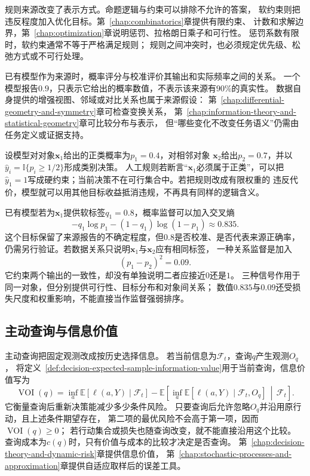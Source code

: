 规则来源改变了表示方式。命题逻辑与约束可以排除不允许的答案，
软约束则把违反程度加入优化目标。第~\ref{chap:combinatorics}章提供有限约束、
计数和求解边界，第~\ref{chap:optimization}章说明惩罚、拉格朗日乘子和可行性。
惩罚系数有限时，软约束通常不等于严格满足规则；
规则之间冲突时，也必须规定优先级、松弛方式或不可行处理。

已有模型作为来源时，概率评分与校准评价其输出和实际频率之间的关系。
一个模型报告$0.9$，只表示它给出的概率数值，不表示该来源有$90\%$的真实性。
数据自身提供的增强视图、邻域或对比关系也属于来源假设：
第~\ref{chap:differential-geometry-and-symmetry}章可检查变换关系，
第~\ref{chap:information-theory-and-statistical-geometry}章可比较分布与表示，
但“哪些变化不改变任务语义”仍需由任务定义或证据支持。

\begin{example}[同一对象上的三种监督]
  \label{ex:future-supervision-three-forms}
  设模型对对象\(\bm x_1\)给出的正类概率为\(p_1=0.4\)，对相邻对象
  \(\bm x_2\)给出\(p_2=0.7\)，并以
  \(\widehat y_i=\mathbb{I}\{p_i\geq1/2\}\)形成类别决策。
  人工规则若断言“\(\bm x_1\)必须属于正类”，可以把
  \(\widehat y_1=1\)写成硬约束；当前决策不在可行集合中。若把规则改成有限权重的
  违反代价，模型就可以用其他目标收益抵消违规，不再具有同样的逻辑含义。

  已有模型若为\(\bm x_1\)提供软标签\(q_1=0.8\)，概率监督可以加入交叉熵
  \[
    -q_1\log p_1-(1-q_1)\log(1-p_1)
    \approx0.835.
  \]
  这个目标保留了来源报告的不确定程度，但\(0.8\)是否校准、是否代表来源正确率，
  仍需另行验证。若数据关系只说明\(\bm x_1\)与\(\bm x_2\)应有相同标签，
  一种关系监督是加入
  \[
    (p_1-p_2)^2=0.09.
  \]
  它约束两个输出的一致性，却没有单独说明二者应接近\(0\)还是\(1\)。
  三种信号作用于同一对象，但分别提供可行性、目标分布和对象间关系；
  数值\(0.835\)与\(0.09\)还受损失尺度和权重影响，不能直接当作监督强弱排序。
\end{example}

\subsection{主动查询与信息价值}
\label{sec:future-passive-information-active-query}

主动查询把固定观测改成按历史选择信息。
若当前信息为$\mathcal{F}_t$，查询$q$产生观测$O_q$，
将定义~\ref{def:decision-expected-sample-information-value}用于当前查询，信息价值写为
\[
  \operatorname{VOI}(q)
  =
  \inf_a
  \mathbb{E}[\ell(a,Y)\mid\mathcal{F}_t]
  -
  \mathbb{E}\!\left[
    \inf_a
    \mathbb{E}[\ell(a,Y)\mid\mathcal{F}_t,O_q]
    \,\middle|\,
    \mathcal{F}_t
  \right].
\]
它衡量查询后重新决策能减少多少条件风险。
只要查询后允许忽略$O_q$并沿用原行动，且上述条件期望存在，
第二项的最优风险不会高于第一项，因而$\operatorname{VOI}(q)\geq0$；
若行动集合或损失也随查询改变，就不能直接沿用这个比较。
查询成本为$c(q)$时，只有价值与成本的比较才决定是否查询。
第~\ref{chap:decision-theory-and-dynamic-risk}章提供信息价值，
第~\ref{chap:stochastic-processes-and-approximation}章提供自适应取样后的误差工具。

